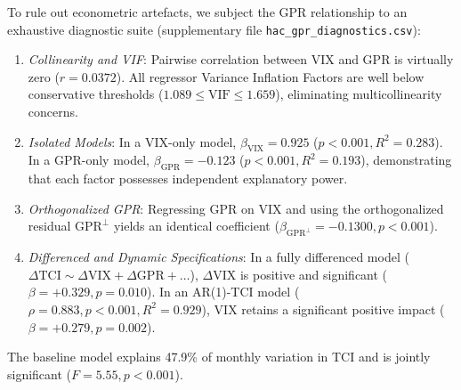 \documentclass[12pt,a4paper]{article}
\begin{document}
To rule out econometric artefacts, we subject the GPR relationship to an exhaustive diagnostic suite (supplementary file \texttt{hac\_gpr\_diagnostics.csv}):
\begin{enumerate}
\item \emph{Collinearity and VIF}: Pairwise correlation between VIX and GPR is virtually zero ($r = 0.0372$). All regressor Variance Inflation Factors are well below conservative thresholds ($1.089 \le \text{VIF} \le 1.659$), eliminating multicollinearity concerns.
\item \emph{Isolated Models}: In a VIX-only model, $\beta_{\text{VIX}} = 0.925$ ($p < 0.001, R^2 = 0.283$). In a GPR-only model, $\beta_{\text{GPR}} = -0.123$ ($p < 0.001, R^2 = 0.193$), demonstrating that each factor possesses independent explanatory power.
\item \emph{Orthogonalized GPR}: Regressing GPR on VIX and using the orthogonalized residual $\text{GPR}^{\perp}$ yields an identical coefficient ($\beta_{\text{GPR}^{\perp}} = -0.1300, p < 0.001$).
\item \emph{Differenced and Dynamic Specifications}: In a fully differenced model ($\Delta\text{TCI} \sim \Delta\text{VIX} + \Delta\text{GPR} + \dots$), $\Delta\text{VIX}$ is positive and significant ($\beta = +0.329, p = 0.010$). In an AR(1)-TCI model ($\rho = 0.883, p < 0.001, R^2 = 0.929$), VIX retains a significant positive impact ($\beta = +0.279, p = 0.002$).
\end{enumerate}
The baseline model explains 47.9\% of monthly variation in TCI and is jointly significant ($F=5.55, p < 0.001$).
\end{document}
